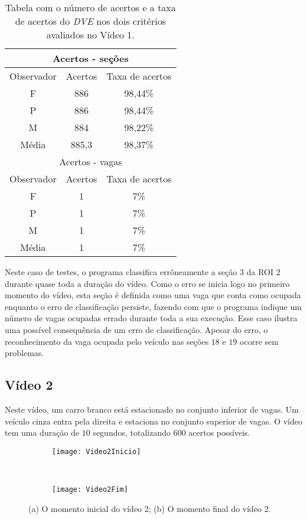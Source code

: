 \begin{table}[H]
\begin{center}
\begin{tabular}{|c||c||c|}
\hline
\multicolumn{3}{|c|}{Acertos - seções}  \\ \hline \hline
Observador & Acertos& Taxa de acertos \\ \hline
F & 886 & 98,44\% \\  \hline
P & 886 & 98,44\% \\ \hline
M & 884 & 98,22\% \\ \hline
Média & 885,3 & 98,37\% \\
\hline
\hline
\multicolumn{3}{|c|}{Acertos - vagas}  \\ \hline \hline
Observador & Acertos & Taxa de acertos \\ \hline
F & 1 & 7\% \\  \hline
P & 1 & 7\% \\ \hline
M & 1 & 7\% \\ \hline
Média & 1 & 7\% \\
\hline
\end{tabular}
\caption{Tabela com o número de acertos e a taxa de acertos do \textit{DVE} nos dois critérios avaliados no Vídeo 1.}
\label{tab:rvideo1}
\end{center}
\end{table}


Neste caso de testes, o programa classifica errôneamente a seção $3$ da ROI $2$ durante quase toda a duração do vídeo. Como o erro se inicia logo no primeiro momento do vídeo, esta seção é definida como uma vaga que conta como ocupada enquanto o erro de classificação persiste, fazendo com que o programa indique um número de vagas ocupadas errado durante toda a sua execução. Esse caso ilustra uma possível consequência de um erro de classificação. Apesar do erro, o reconhecimento da vaga ocupada pelo veículo nas seções $18$ e $19$ ocorre sem problemas.

\subsection{Vídeo 2}

Neste vídeo, um carro branco está estacionado no conjunto inferior de vagas. Um veículo cinza entra pela direita e estaciona no conjunto superior de vagas. O vídeo tem uma duração de $10$ segundos, totalizando $600$ acertos possíveis.

\begin{figure}[H]
\centering
\begin{subfigure}{.5\textwidth}
\centering
\texttt{[image: Video2Inicio]}
\caption{}
\end{subfigure}\
\begin{subfigure}{.5\textwidth}
\centering
\texttt{[image: Video2Fim]}
\caption{}
\end{subfigure}
\centering
\caption{(a) O momento inicial do vídeo 2; (b) O momento final do vídeo 2.}%
\label{}%
\end{figure}

